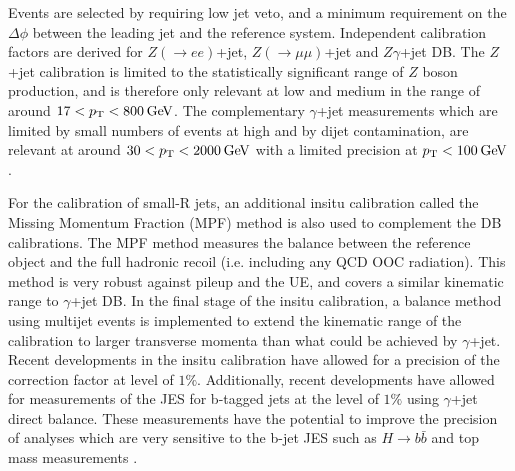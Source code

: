 Events are selected by requiring low \pt jet veto, and a minimum requirement on the $\Delta\phi$ between the leading jet and the reference system. Independent calibration factors are derived for $Z(\rightarrow ee)$+jet, $Z(\rightarrow \mu\mu)$+jet and $Z\gamma$+jet DB. The $Z$+jet calibration is limited to the statistically significant \pt range of $Z$ boson production, and is therefore only relevant at low and medium \pt in the range of around $17 < p_{\text{T}} < 800\hspace{2pt}\text{Ge\kern -0.1em V}$. The complementary $\gamma$+jet measurements which are limited by small numbers of events at high \pt and by dijet contamination, are relevant at around $30<p_{\text{T}}<2000\hspace{2pt}\text{Ge\kern -0.1em V}$ with a limited precision at $p_{\text{T}}<100\hspace{2pt}\text{Ge\kern -0.1em V}$.

For the calibration of small-R jets, an additional insitu calibration called the Missing Momentum Fraction (MPF) method is also used to complement the DB calibrations. The MPF method measures the \pt balance between the reference object and the full hadronic recoil (i.e. including any QCD OOC radiation). This method is very robust against pileup and the UE, and covers a similar kinematic range to $\gamma$+jet DB. In the final stage of the insitu calibration, a \pt balance method using multijet events is implemented to extend the kinematic range of the calibration to larger transverse momenta than what could be achieved by $\gamma$+jet. Recent developments in the insitu calibration have allowed for a precision of the correction factor at level of $1\%$. Additionally, recent developments have allowed for measurements of the JES for b-tagged jets at the level of $1\%$ using $\gamma$+jet direct balance. These measurements have the potential to improve the precision of analyses which are very sensitive to the b-jet JES such as $H\rightarrow b\bar{b}$ and top mass measurements \cite{Atlas:smallrnewtechniques,Atlas:largercali,Atlas:smallrcali}.

